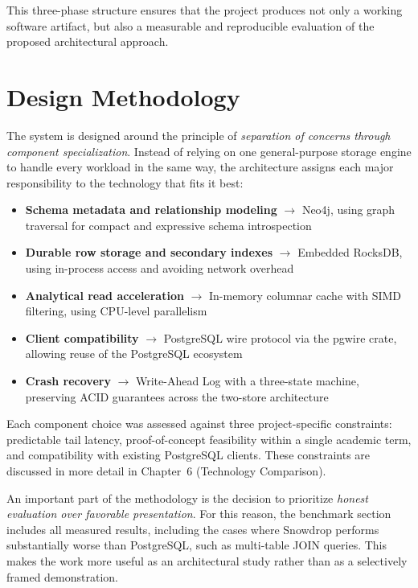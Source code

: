 This three-phase structure ensures that the project produces not only a working software artifact, but also a measurable and reproducible evaluation of the proposed architectural approach.

\section{Design Methodology}

The system is designed around the principle of \textit{separation of concerns through component specialization}. Instead of relying on one general-purpose storage engine to handle every workload in the same way, the architecture assigns each major responsibility to the technology that fits it best:

\begin{itemize}
    \item \textbf{Schema metadata and relationship modeling} $\rightarrow$ Neo4j, using graph traversal for compact and expressive schema introspection~\cite{robinson2015}
    \item \textbf{Durable row storage and secondary indexes} $\rightarrow$ Embedded RocksDB, using in-process access and avoiding network overhead~\cite{matsunobu2020}
    \item \textbf{Analytical read acceleration} $\rightarrow$ In-memory columnar cache with SIMD filtering, using CPU-level parallelism~\cite{zhou2002}
    \item \textbf{Client compatibility} $\rightarrow$ PostgreSQL wire protocol via the pgwire crate, allowing reuse of the PostgreSQL ecosystem
    \item \textbf{Crash recovery} $\rightarrow$ Write-Ahead Log with a three-state machine, preserving ACID guarantees across the two-store architecture~\cite{mohan1992}
\end{itemize}

Each component choice was assessed against three project-specific constraints: predictable tail latency, proof-of-concept feasibility within a single academic term, and compatibility with existing PostgreSQL clients. These constraints are discussed in more detail in Chapter~6 (Technology Comparison).

An important part of the methodology is the decision to prioritize \textit{honest evaluation over favorable presentation}. For this reason, the benchmark section includes all measured results, including the cases where Snowdrop performs substantially worse than PostgreSQL, such as multi-table JOIN queries. This makes the work more useful as an architectural study rather than as a selectively framed demonstration.

